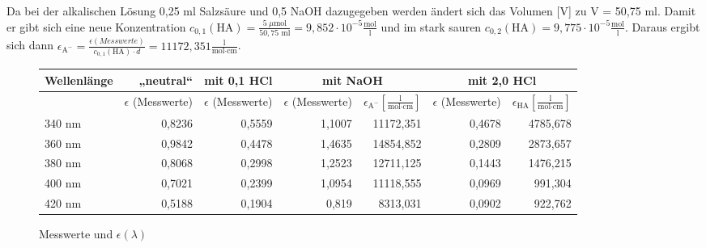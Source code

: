 \documentclass{scrartcl}
\begin{document}
Da bei der alkalischen Lösung 0,25 ml Salzsäure und 0,5 NaOH dazugegeben werden ändert sich das Volumen [V] zu V = 50,75 ml. Damit er gibt sich eine neue Konzentration $c_{0,1}(\text{HA}) = \frac{5 \;\mu \text{mol}}{50,75 \text{ ml}} = 9,852 \cdot 10^{-5} \frac{\text{mol}}{\text{l}}$ und im stark sauren $c_{0,2}(\text{HA}) = 9,775 \cdot 10^{-5} \frac{\text{mol}}{\text{l}}$. Daraus ergibt sich dann $\epsilon_{\text{A}^-} = \frac{\epsilon (Messwerte)}{c_{0,1}(\text{HA}) \cdot d} = 11172,351 \frac{\text{l}}{\text{mol} \cdot \text{cm}}$.
\begin{figure}[h]
	\centering
	\caption{Messwerte und $\epsilon(\lambda)$}
	\begin{tabular}{l|| r | r | r r | r r }
		Wellenlänge & „neutral“ & mit 0,1 HCl & \multicolumn{2}{c|}{mit NaOH} & \multicolumn{2}{c}{mit 2,0 HCl} \\ \hline \hline
		& $\epsilon$ (Messwerte) & $\epsilon$ (Messwerte) & $\epsilon$ (Messwerte) & $\epsilon_{\text{A}^-}[\frac{\text{l}}{\text{mol} \cdot \text{cm}}]$ & $\epsilon$ (Messwerte) & $\epsilon_{\text{HA}} [\frac{\text{l}}{\text{mol} \cdot \text{cm}}]$ \\ \hline
	 	340 nm & 0,8236 & 0,5559 & 1,1007 & 11172,351 & 0,4678 & 4785,678 \\
		360 nm & 0,9842 & 0,4478 & 1,4635 & 14854,852 & 0,2809 & 2873,657 \\
		380 nm & 0,8068 & 0,2998 & 1,2523 & 12711,125 & 0,1443 & 1476,215 \\
		400 nm & 0,7021 & 0,2399 & 1,0954 & 11118,555 & 0,0969 & 991,304 \\
		420 nm & 0,5188 & 0,1904 & 0,819 & 8313,031 & 0,0902 & 922,762
	\end{tabular}
\end{figure}
\end{document}

